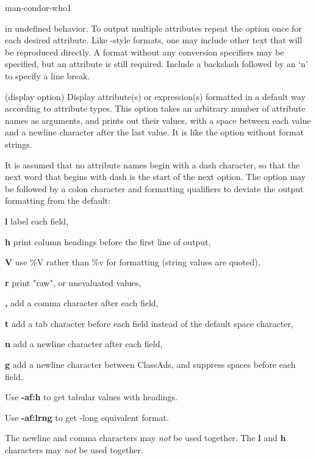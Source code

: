 \begin{ManPage}{}{man-condor-who}{1}
\begin{Options}
{      in undefined behavior.  To output multiple attributes
      repeat the  option once for each desired
      attribute.
      Like -style formats, one may include other
      text that will be reproduced directly.
      A format without any conversion specifiers may be specified,
      but an attribute is still required.
      Include a backslash followed by an `n' to specify a line break. }
   {
    (display option) Display attribute(s) or expression(s)
    formatted in a default way according to attribute types.  
    This option takes an arbitrary number of attribute names as arguments,
    and prints out their values, 
    with a space between each value and a newline character after 
    the last value.  
    It is like the  option without format strings.

    It is assumed that no attribute names begin with a dash character,
    so that the next word that begins with dash is the 
    start of the next option.
    The  option may be followed by a colon character
    and formatting qualifiers to deviate the output formatting from
    the default:

    \textbf{l} label each field,

    \textbf{h} print column headings before the first line of output,

    \textbf{V} use \%V rather than \%v for formatting (string values
    are quoted),

    \textbf{r} print "raw", or unevaluated values,

    \textbf{,} add a comma character after each field,

    \textbf{t} add a tab character before each field instead of 
    the default space character,

    \textbf{n} add a newline character after each field,

    \textbf{g} add a newline character between ClassAds, and
    suppress spaces before each field.

    Use \textbf{-af:h} to get tabular values with headings.

    Use \textbf{-af:lrng} to get -long equivalent format.

    The newline and comma characters may \emph{not} be used together.
    The \textbf{l} and \textbf{h} characters may \emph{not} be used
    together.
    }
\end{Options}


\end{ManPage}
